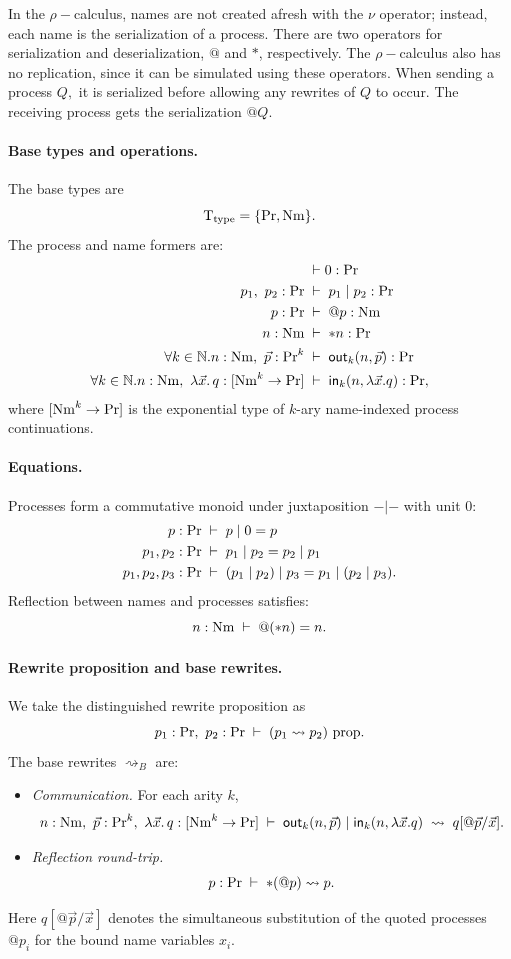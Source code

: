 \documentclass[11pt]{article}
\theoremstyle{definition}
\theoremstyle{plain}
\theoremstyle{remark}
\theoremstyle{plain}
\renewcommand{\Pr}{{\rm Pr}}
\newcommand{\Nm}{{\rm Nm}}
\newcommand{\rsq}{\rightsquigarrow}
\newcommand{\mrm}[1]{\mathrm{#1}}
\newcommand{\T}{\mrm{T}}
\begin{document}
In the $\rho-$calculus, names are not created afresh with the $\nu$ operator; instead, each name is the serialization of a process.  There are two operators for serialization and deserialization, $@$ and $\ast$, respectively.  The $\rho-$calculus also has no replication, since it can be simulated using these operators.  When sending a process $Q,$ it is serialized before allowing any rewrites of $Q$ to occur. The receiving process gets the serialization $@Q.$

\paragraph{Base types and operations.}
The base types are
\[
  \T_{\mathrm{type}} = \{\Pr,\Nm\}.
\]
The process and name formers are:
\begin{align*}
  &\vdash 0 : \Pr\\
  p_1,\ p_2:\Pr \;&\vdash\; p_1 \mid p_2 : \Pr\\
  p:\Pr \;&\vdash\; @p : \Nm \\
  n:\Nm \;&\vdash\; \ast n : \Pr \\
  \forall k \in \mathbb{N}. n:\Nm,\ \vec p:\Pr^k \;&\vdash\; \mathsf{out}_k(n,\vec p) : \Pr \\
  \forall k \in \mathbb{N}.n:\Nm,\ \lambda\vec x.\,q : [\Nm^k\to\Pr] \;&\vdash\; \mathsf{in}_k(n,\lambda\vec x.q) : \Pr,
\end{align*}
where $[\Nm^k\to\Pr]$ is the exponential type of $k$-ary name-indexed process continuations.

\paragraph{Equations.}
Processes form a commutative monoid under juxtaposition $-|-$ with unit $0$:
\begin{align*}
  p:\Pr \;&\vdash\; p \mid 0 = p\\
  p_1,p_2:\Pr \;&\vdash\; p_1 \mid p_2 = p_2 \mid p_1\\
  p_1,p_2,p_3:\Pr \;&\vdash\; (p_1 \mid p_2)\mid p_3 = p_1 \mid(p_2 \mid p_3).
\end{align*}
Reflection between names and processes satisfies:
\[
  n:\Nm \;\vdash\; @(\ast n) = n.
\]

\paragraph{Rewrite proposition and base rewrites.}
We take the distinguished rewrite proposition as
\[
  p_1:\Pr,\ p_2:\Pr \;\vdash\; (p_1 \rsq p_2)\ \mrm{prop}.
\]
The base rewrites $\rsq_B$ are:
\begin{itemize}
  \item \emph{Communication.}  For each arity $k$,
  \[
    n:\Nm,\ \vec p:\Pr^k,\ \lambda\vec x.\,q : [\Nm^k\to\Pr]
    \;\vdash\;
    \mathsf{out}_k(n,\vec p) \mid \mathsf{in}_k(n,\lambda\vec x.q)
      \;\rsq\;
    q[@\vec p/\vec x].
  \]
  \item \emph{Reflection round-trip.}
  \[
    p:\Pr \;\vdash\; \ast(@p) \rsq p.
  \]
\end{itemize}
Here $q[@\vec p/\vec x]$ denotes the simultaneous substitution of the quoted processes
$@p_i$ for the bound name variables $x_i$.
\end{document}

